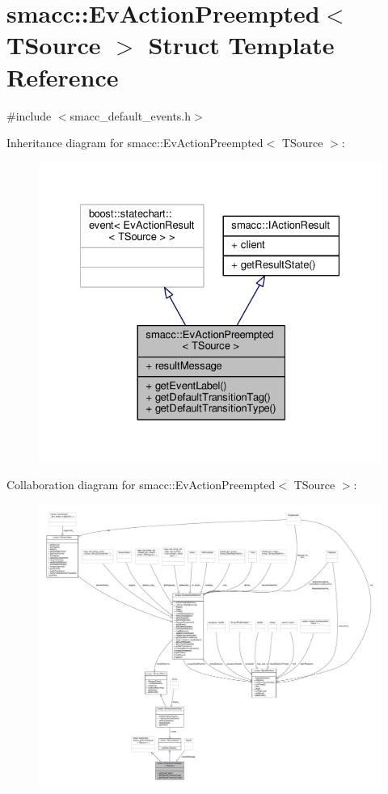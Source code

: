 \hypertarget{structsmacc_1_1EvActionPreempted}{}\section{smacc\+:\+:Ev\+Action\+Preempted$<$ T\+Source $>$ Struct Template Reference}
\label{structsmacc_1_1EvActionPreempted}


{\ttfamily \#include $<$smacc\+\_\+default\+\_\+events.\+h$>$}



Inheritance diagram for smacc\+:\+:Ev\+Action\+Preempted$<$ T\+Source $>$\+:
\nopagebreak
\begin{figure}[H]
\begin{center}
\leavevmode
\includegraphics[width=328pt]{structsmacc_1_1EvActionPreempted__inherit__graph}
\end{center}
\end{figure}


Collaboration diagram for smacc\+:\+:Ev\+Action\+Preempted$<$ T\+Source $>$\+:
\nopagebreak
\begin{figure}[H]
\begin{center}
\leavevmode
\includegraphics[width=350pt]{structsmacc_1_1EvActionPreempted__coll__graph}
\end{center}
\end{figure}
